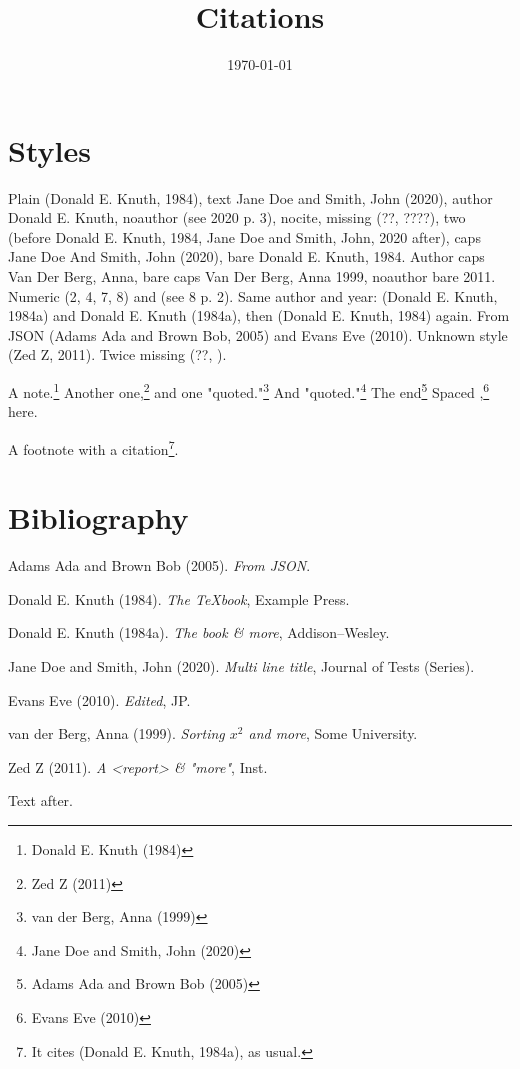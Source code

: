 \documentclass[11pt]{article}
\date{\today}
\title{Citations}
\begin{document}
\maketitle
\tableofcontents

\section{Styles}
\label{sec:org0e4d337}
Plain (Donald E. Knuth, 1984), text Jane Doe and Smith, John (2020), author Donald E. Knuth,
noauthor (see 2020 p. 3), nocite, missing (??, ????),
two (before Donald E. Knuth, 1984,  Jane Doe and Smith, John, 2020 after), caps Jane Doe And Smith, John (2020), bare Donald E. Knuth, 1984.
Author caps Van Der Berg, Anna, bare caps Van Der Berg, Anna 1999, noauthor bare 2011.
Numeric (2, 4, 7, 8) and (see 8 p. 2).
Same author and year: (Donald E. Knuth, 1984a) and Donald E. Knuth (1984a), then (Donald E. Knuth, 1984) again.
From JSON (Adams Ada and Brown Bob, 2005) and Evans Eve (2010).
Unknown style (Zed Z, 2011).  Twice missing (??, ).

A note.\footnote{Donald E. Knuth (1984)} Another one,\footnote{Zed Z (2011)} and one "quoted."\footnote{van der Berg, Anna (1999)}
And "quoted."\footnote{Jane Doe and Smith, John (2020)} The end\footnote{Adams Ada and Brown Bob (2005)}
Spaced ,\footnote{Evans Eve (2010)}  here.

A footnote with a citation\footnote{It cites (Donald E. Knuth, 1984a), as usual.}.
\section{Bibliography}
\label{sec:org3028fdc}
\noindent
Adams Ada and Brown Bob (2005). \emph{From JSON}.

\noindent
Donald E. Knuth (1984). \emph{The {\TeX}book}, Example Press.

\noindent
Donald E. Knuth (1984a). \emph{The \METAFONT book \& more}, Addison--Wesley.

\noindent
Jane Doe and Smith, John (2020). \emph{Multi line title}, Journal of Tests (Series).

\noindent
Evans Eve (2010). \emph{Edited}, JP.

\noindent
van der Berg, Anna (1999). \emph{Sorting $x^2$ and \alpha{} more}, Some University.

\noindent
Zed Z (2011). \emph{A <report> & "more"}, Inst.

Text after.
\end{document}
